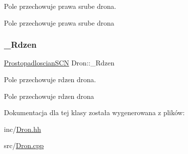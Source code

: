 Pole przechowuje prawa srube drona. 

Pole przechowuje prawa srube drona \mbox{\label{classDron_af62e07b9d016168d5a129515f65f1609}} 
\subsubsection{\texorpdfstring{\+\_\+\+Rdzen}{\_Rdzen}}
{\footnotesize\ttfamily \hyperlink{classProstopadloscianSCN}{Prostopadloscian\+S\+CN} Dron\+::\+\_\+\+Rdzen\hspace{0.3cm}{\ttfamily [private]}}



Pole przechowuje rdzen drona. 

Pole przechowuje rdzen drona 

Dokumentacja dla tej klasy została wygenerowana z plików\+:\begin{DoxyCompactItemize}
\item 
inc/\hyperlink{Dron_8hh}{Dron.\+hh}\item 
src/\hyperlink{Dron_8cpp}{Dron.\+cpp}\end{DoxyCompactItemize}
